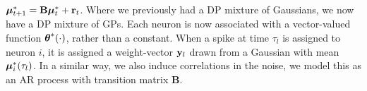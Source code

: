 % 
  $\boldsymbol{\mu}^*_{t+1} = \mathbf{B} \boldsymbol{\mu}^*_t + \mathbf{r}_t$.
Where we previously had a DP mixture of Gaussians, we now have a DP mixture of GPs. Each neuron is now associated with a vector-valued function 
$\boldsymbol{\theta}^*(\cdot)$, rather than a constant. When a spike at time $\tau_l$ is assigned to neuron $i$, it is assigned a weight-vector $\mathbf{y}_l$ drawn from a 
Gaussian with mean $\boldsymbol{\mu}^*_i(\tau_l)$. %
In a similar way, we also induce correlations in the noise, we model this as an AR process with transition matrix $\mathbf{B}$.

